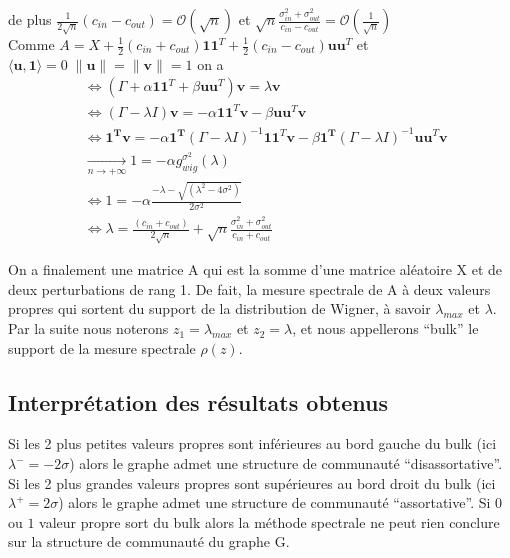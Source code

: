 de plus $\frac{1}{2\sqrt{n}}(c_{in} - c_{out}) = \mathcal{O}(\sqrt{n})$ et $\sqrt{n}\frac{\sigma_{in}^2 + \sigma_{out}^2}{c_{in} - c_{out}} =  \mathcal{O}\left(\frac{1}{\sqrt{n}}\right)$\\
 
Comme $A = X + \frac{1}{2}(c_{in} + c_{out})\mathbf{11}^T + \frac{1}{2}(c_{in} - c_{out})\mathbf{uu}^T$ et $\langle\mathbf{u}, \mathbf{1}\rangle = 0 \; \|\mathbf{u}\|=\|\mathbf{v}\|=1$ on a
\begin{align}
	&\Leftrightarrow (\Gamma + \alpha\mathbf{11}^T + \beta \mathbf{uu}^T)\mathbf{v} = \lambda \mathbf{v}\nonumber\\
	&\Leftrightarrow (\Gamma - \lambda I)\mathbf{v} = -\alpha\mathbf{11}^T\mathbf{v} - \beta \mathbf{uu}^T\mathbf{v} \nonumber\\
	&\Leftrightarrow \mathbf{1^Tv} = -\alpha\mathbf{1^T} (\Gamma - \lambda I)^{-1}\mathbf{11}^T\mathbf{v} - \beta \mathbf{1^T} (\Gamma - \lambda I)^{-1}\mathbf{uu}^T\mathbf{v} \nonumber\\
	&\xrightarrow[n \to +\infty]{} 1 = -\alpha g_{wig}^{\sigma^2}(\lambda) \nonumber\\
	&\Leftrightarrow 1 = -\alpha  \frac{- \lambda - \sqrt{(\lambda^2 - 4\sigma^2)}}{2\sigma^2}\nonumber\\
	&\Leftrightarrow \boxed{\lambda = \frac{(c_{in} + c_{out})}{2\sqrt{n}} + \sqrt{n}\frac{\sigma_{in}^2 + \sigma_{out}^2}{c_{in} + c_{out}}} \label{z_2}
\end{align} 

On a finalement une matrice A qui est la somme d'une matrice aléatoire X et de deux perturbations de rang 1.
De fait, la mesure spectrale de A à deux valeurs propres qui sortent du support de la distribution de Wigner, à savoir $\lambda_{max}$ et $\lambda$.
Par la suite nous noterons $z_1 = \lambda_{max}$ et $z_2 = \lambda$, et nous appellerons ``bulk'' le support de la mesure spectrale $\rho(z)$.

\subsection{Interprétation des résultats obtenus}
\label{subsec:1.3}
Si les 2 plus petites valeurs propres sont inférieures au bord gauche du bulk (ici $\lambda^- = -2\sigma$) alors le graphe admet une structure de communauté ``disassortative''.
Si les 2 plus grandes valeurs propres sont supérieures au bord droit du bulk (ici $\lambda^+ = 2\sigma$) alors le graphe admet une structure de communauté ``assortative''.
Si $0$ ou $1$ valeur propre sort du bulk alors la méthode spectrale ne peut rien conclure sur la structure de communauté du graphe G.\\

